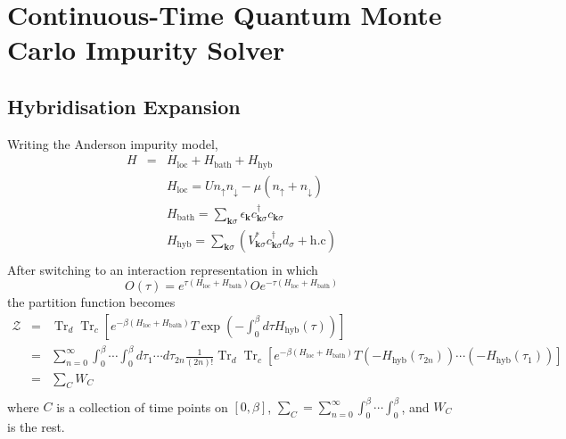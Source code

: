 \documentclass[a4paper]{article}
\DeclareMathOperator{\Tr}{Tr}
\begin{document}
\section{Continuous-Time Quantum Monte Carlo Impurity Solver} %
\label{sec:Continuous-Time Quantum Monte Carlo Impurity Solver}
\subsection{Hybridisation Expansion} %
\label{sub:Hybridisation Expansion}
Writing the Anderson impurity model,
\begin{eqnarray}
    H &=&   H_{\text{loc}} + H_{\text{bath}} + H_{\text{hyb}} \\
       &&   H_{\text{loc}} =
                Un_{\uparrow}n_{\downarrow}-\mu(n_{\uparrow}+n_{\downarrow}) \\
       &&   H_{\text{bath}} =
                \sum_{\mathbf{k}\sigma} \epsilon_{\mathbf{k}}
                c_{\mathbf{k}\sigma}^{\dagger}c_{\mathbf{k}\sigma}\\
       &&   H_{\text{hyb}} = 
                \sum_{\mathbf{k}\sigma}
                \left( 
                    V_{\mathbf{k}\sigma}^{*}
                    c_{\mathbf{k}\sigma}^{\dagger}d_{\sigma}
                   +\text{h.c}
                \right) \\
\end{eqnarray}
After switching to an interaction representation in which
\begin{equation}
    O(\tau) = 
        e^{ \tau(H_{\text{loc}} + H_{\text{bath}})}
        O
        e^{-\tau(H_{\text{loc}} + H_{\text{bath}})}
\end{equation}
the partition function becomes
\begin{eqnarray}
    \mathcal{Z} 
        &=& \Tr_{d}\Tr_{c} \left[
                e^{-\beta(H_{\text{loc}} + H_{\text{bath}})} T\exp \left(
                    -\int_{0}^{\beta}d\tau H_{\text{hyb}}(\tau)
                    \right)
                \right] \\
        &=& \sum_{n=0}^{\infty} \int_{0}^{\beta} \cdots \int_{0}^{\beta}
                d\tau_{1} \cdots d\tau_{2n} \frac{1}{(2n)!} \Tr_{d}\Tr_{c} \left[
                    e^{-\beta(H_{\text{loc}} + H_{\text{bath}})}
                    T (-H_{\text{hyb}}(\tau_{2n}))
                    \cdots (-H_{\text{hyb}}(\tau_{1}))
                \right] \\
        &=& \sum_{C} W_C \\
\end{eqnarray}
where $C$ is a collection of time points on $[0,\beta]$, $\sum_{C} =
\sum_{n=0}^{\infty} \int_{0}^{\beta} \cdots \int_{0}^{\beta}$, and $W_C$ is the
rest.
\end{document}
